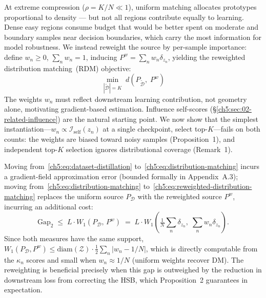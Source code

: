 \begin{foldable} %
    At extreme compression ($\rho = K/N \ll 1$), uniform matching allocates prototypes proportional to density --- but not all regions contribute equally to learning.
    Dense easy regions consume budget that would be better spent on moderate and boundary samples near decision boundaries, which carry the most information for model robustness.
    We instead reweight the source by per-sample importance: define $w_n \geq 0$, $\sum_n w_n = 1$, inducing $P^w = \sum_n w_n \delta_{z_n}$, yielding the reweighted distribution matching~(RDM) objective:
    \begin{equation}
        \min_{|\tilde{\mathcal{D}}| = K}\; d\!\left(P_{\tilde{\mathcal{D}}},\; P^w\right)
        \label{ch5:eq:reweighted-distribution-matching}
    \end{equation}
    The weights $w_n$ must reflect downstream learning contribution, not geometry alone, motivating gradient-based estimation.
    Influence self-scores (\S\ref{ch5:sec:02-related-influence}) are the natural starting point.
    We now show that the simplest instantiation---$w_n \propto \mathcal{I}_\text{self}(z_n)$ at a single checkpoint, select top-$K$---fails on both counts: the weights are biased toward noisy samples (Proposition~1), and independent top-$K$ selection ignores distributional coverage (Remark~1).
    \begin{remark}
        Moving from~\eqref{ch5:eq:dataset-distillation} to~\eqref{ch5:eq:distribution-matching} incurs a gradient-field approximation error (bounded formally in Appendix~A.3); moving from~\eqref{ch5:eq:distribution-matching} to~\eqref{ch5:eq:reweighted-distribution-matching} replaces the uniform source $P_\mathcal{D}$ with the reweighted source $P^w$, incurring an additional cost:
        \begin{equation}
            \mathrm{Gap}_2 \;\leq\; L \cdot W_1(P_\mathcal{D},\, P^w) \;=\; L \cdot W_1\!\left(\tfrac{1}{N}\textstyle\sum_n \delta_{z_n},\; \textstyle\sum_n w_n \delta_{z_n}\right).
            \label{ch5:eq:gap2}
        \end{equation}
        Since both measures have the same support, $W_1(P_\mathcal{D}, P^w) \leq \mathrm{diam}(\mathcal{Z}) \cdot \frac{1}{2}\sum_n |w_n - 1/N|$, which is directly computable from the $\kappa_n$ scores and small when $w_n \approx 1/N$ (uniform weights recover DM).
        The reweighting is beneficial precisely when this gap is outweighed by the reduction in downstream loss from correcting the HSB, which Proposition~2 guarantees in expectation.
    \end{remark}
\end{foldable}


